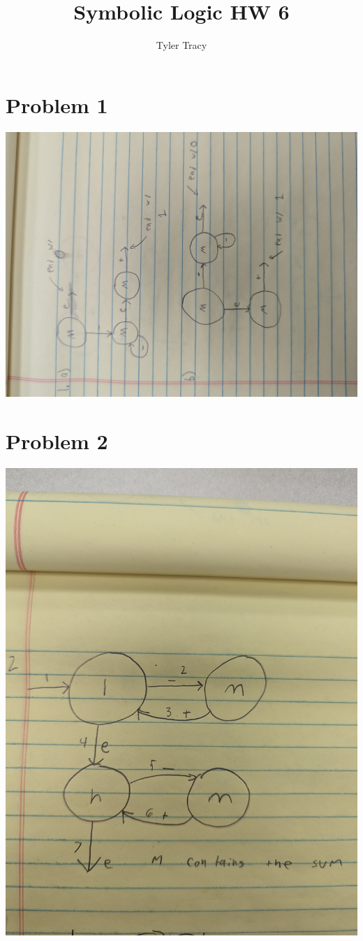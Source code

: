 \documentclass[12pt]{article}
\title{Symbolic Logic HW 6}
\author{Tyler Tracy}
\begin{document}
\maketitle

\section*{Problem 1}

\includegraphics[angle=270,width=\textwidth]{1}

\section*{Problem 2}

\includegraphics[width=\textwidth]{2}
\end{document}
